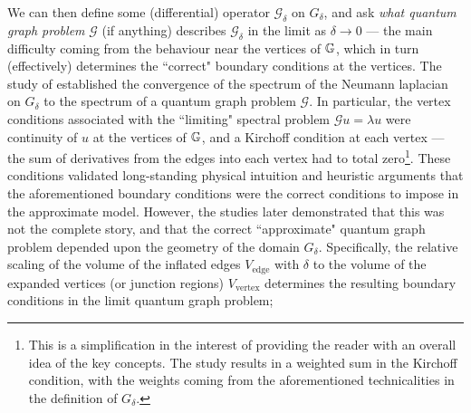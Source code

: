 We can then define some (differential) operator $\mathcal{G}_{\delta}$ on $G_{\delta}$, and ask \emph{what quantum graph problem} $\mathcal{G}$ (if anything) describes $\mathcal{G}_{\delta}$ in the limit as $\delta\rightarrow0$ --- the main difficulty coming from the behaviour near the vertices of $\mathbb{G}$, which in turn (effectively) determines the ``correct" boundary conditions at the vertices.
The study of  established the convergence of the spectrum of the Neumann laplacian on $G_{\delta}$ to the spectrum of a quantum graph problem $\mathcal{G}$.
In particular, the vertex conditions associated with the ``limiting" spectral problem $\mathcal{G}u = \lambda u$ were continuity of $u$ at the vertices of $\mathbb{G}$, and a Kirchoff condition at each vertex --- the sum of derivatives from the edges into each vertex had to total zero\footnote{This is a simplification in the interest of providing the reader with an overall idea of the key concepts. The study  results in a weighted sum in the Kirchoff condition, with the weights coming from the aforementioned technicalities in the definition of $G_{\delta}$.}.
These conditions validated long-standing physical intuition and heuristic arguments that the aforementioned boundary conditions were the correct conditions to impose in the approximate model.
However, the studies  later demonstrated that this was not the complete story, and that the correct ``approximate" quantum graph problem depended upon the geometry of the domain $G_{\delta}$.
Specifically, the relative scaling of the volume of the inflated edges $V_{\mathrm{edge}}$ with $\delta$ to the volume of the expanded vertices (or junction regions) $V_{\mathrm{vertex}}$  determines the resulting boundary conditions in the limit quantum graph problem;
